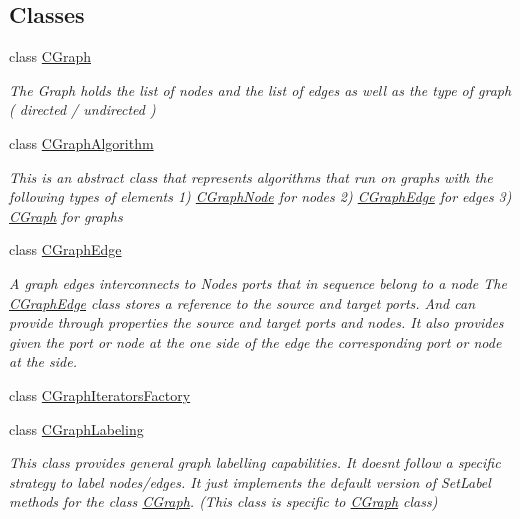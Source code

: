 \subsection*{Classes}
\begin{DoxyCompactItemize}
\item 
class \hyperlink{class_graph_library_1_1_c_graph}{C\+Graph}
\begin{DoxyCompactList}\small\item\em The Graph holds the list of nodes and the list of edges as well as the type of graph ( directed / undirected ) \end{DoxyCompactList}\item 
class \hyperlink{class_graph_library_1_1_c_graph_algorithm}{C\+Graph\+Algorithm}
\begin{DoxyCompactList}\small\item\em This is an abstract class that represents algorithms that run on graphs with the following types of elements 1) \hyperlink{class_graph_library_1_1_c_graph_node}{C\+Graph\+Node} for nodes 2) \hyperlink{class_graph_library_1_1_c_graph_edge}{C\+Graph\+Edge} for edges 3) \hyperlink{class_graph_library_1_1_c_graph}{C\+Graph} for graphs \end{DoxyCompactList}\item 
class \hyperlink{class_graph_library_1_1_c_graph_edge}{C\+Graph\+Edge}
\begin{DoxyCompactList}\small\item\em A graph edges interconnects to Nodes ports that in sequence belong to a node The \hyperlink{class_graph_library_1_1_c_graph_edge}{C\+Graph\+Edge} class stores a reference to the source and target ports. And can provide through properties the source and target ports and nodes. It also provides given the port or node at the one side of the edge the corresponding port or node at the side. \end{DoxyCompactList}\item 
class \hyperlink{class_graph_library_1_1_c_graph_iterators_factory}{C\+Graph\+Iterators\+Factory}
\item 
class \hyperlink{class_graph_library_1_1_c_graph_labeling}{C\+Graph\+Labeling}
\begin{DoxyCompactList}\small\item\em This class provides general graph labelling capabilities. It doesn\textquotesingle{}t follow a specific strategy to label nodes/edges. It just implements the default version of Set\+Label methods for the class \hyperlink{class_graph_library_1_1_c_graph}{C\+Graph}. (This class is specific to \hyperlink{class_graph_library_1_1_c_graph}{C\+Graph} class) \end{DoxyCompactList}\item 

\end{DoxyCompactItemize}
